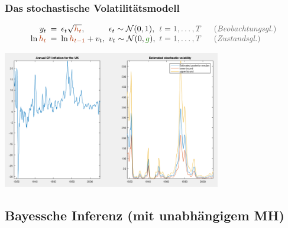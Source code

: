\documentclass[10pt]{beamer}
\theoremstyle{definition}
\newcommand{\Normal}{\mathcal{N}} %
\newcommand{\stepOne}[1]{\textcolor{StepOneColor}{#1}}
\newcommand{\stepTwo}[1]{\textcolor{StepTwoColor}{#1}}
\newcommand{\typeInfo}[1]{\textcolor{TypeInfoColor}{#1}}
\begin{document}
\begin{frame}[t]
  \frametitle{Das stochastische Volatilitätsmodell}
  \begin{modelbox}
    \[
      \arraycolsep=2.5pt
      \begin{array}{rcllll}
        y_t &=& \epsilon_t \sqrt{\stepOne{h_t}}, & \epsilon_t \sim \Normal(0, 1), & \typeInfo{t = 1, \ldots, T} \quad & \text{\typeInfo{(\emph{Beobachtungsgl.})}} \\
        \ln \stepOne{h_t} &=& \ln \stepOne{h_{t-1}} + v_t, & v_t \sim \Normal(0, \stepTwo{g}), & \typeInfo{t = 1, \ldots, T} \quad & \text{\typeInfo{(\emph{Zustandsgl.})}}
      \end{array}
    \]
  \end{modelbox}

  \begin{center}
    \includegraphics[height=6cm]{svol-cpi-inflation.png}
  \end{center}
\end{frame}

\subsection{Bayessche Inferenz (mit unabhängigem MH)}
\end{document}
